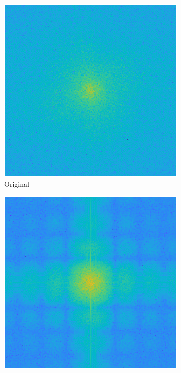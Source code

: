 \begin{figure}[!ht]
    \centering
    \begin{subfigure}{0.32\textwidth}
        \centering
        \includegraphics[width=\textwidth]{Doc/Graphics/Part1/Q17_FT_Spectrum_Original.png}
        \caption{Original}
    \end{subfigure}
    \hfill
    \begin{subfigure}{0.32\textwidth}
        \centering
        \includegraphics[width=\textwidth]{Doc/Graphics/Part1/Q17_FT_Spectrum_Blurred.png}

\end{subfigure}
\end{figure}

